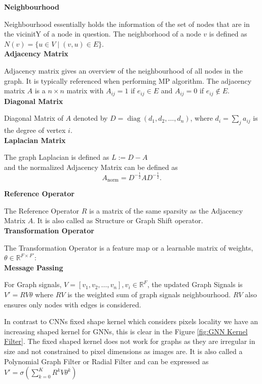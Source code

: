 \documentclass{report} %
\begin{document}
\textbf{Neighbourhood}

Neighbourhood essentially holds the information of the set of nodes that are in the vicinitY of a node in question.
The neighborhood of a node \( v \) is defined as \( N(v) = \{ u \in V \mid (v, u) \in E \} \).\\

\textbf{Adjacency Matrix}

Adjacency matrix gives an overview of the neighbourhood of all nodes in the graph. It is typically referenced when performing \ac{MP} algorithm.
The adjacency matrix \( A \) is a \( n \times n \) matrix with \( A_{ij} = 1 \) if \( e_{ij} \in E \) and \( A_{ij} = 0 \) if \( e_{ij} \notin E \).\\

\textbf{Diagonal Matrix} 

Diagonal Matrix of \( A \) denoted by  \( D = \operatorname{diag}(d_1, d_2, \dots, d_n) \), where \( d_i = \sum_{j} a_{ij} \) is the degree of vertex \( i \).\\

\textbf{Laplacian Matrix}

The graph Laplacian is defined as \( L := D - A \) \\ and the normalized Adjacency Matrix can be defined as
\[
A_{\text{norm}} = D^{-\frac{1}{2}} A D^{-\frac{1}{2}}.
\]

\textbf{Reference Operator}

The Reference Operator \( R \) is a matrix of the same sparsity as the Adjacency Matrix \( A \). It is also called as Structure or Graph Shift operator.\\

\textbf{Transformation Operator}

The Transformation Operator is a feature map or a learnable matrix of weights, \( \theta \in \mathbb{R}^{F \times F'} \):\\

\textbf{Message Passing}

For Graph signals, \( V = [v_1, v_2, \dots, v_n], v_i  \in \mathbb{R}^F \), the updated Graph Signals is \( V' = RV\theta \) 
where \( RV \) is the weighted sum of graph signals neighbourhood. \( RV \) also ensures only nodes with edges is considered.

In contrast to \ac{CNN}s fixed shape kernel which considers pixels locality we have an increasing shaped kernel for \ac{GNN}s, this is clear in the Figure \ref{fig:GNN Kernel Filter}. 
The fixed shaped kernel does not work for graphs  as they are irregular in size and not constrained to pixel dimensions as images are. 
It is also called a Polynomial Graph Filter or Radial Filter and can be expressed as $V' = \sigma (\sum_{k=0}^{K}R^{k}V\theta^{k})$ 
\end{document}
